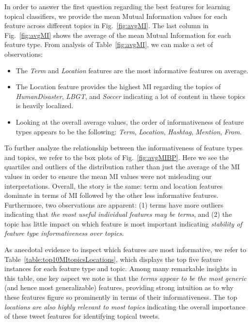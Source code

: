 In order to answer the first question regarding the best features
for learning topical classifiers, we provide the mean Mutual Information
values for each feature across different topics in Fig.~\ref{fig:avgMI}.
The last column in Fig.~\ref{fig:avgMI} shows the
average of the mean Mutual Information for each feature type. From analysis of
Table~\ref{fig:avgMI}, we can make a set of observations:
\begin{itemize}
\item The \textit{Term} and \textit{Location} features are the most informative features on average.%
\item The Location feature provides the highest MI regarding the topics of \textit{HumanDisaster}, \textit{LBGT}, and \textit{Soccer} indicating a lot of content in these topics is heavily localized.
\item Looking at the overall average values, the order of informativeness of feature types appears to be the following: \textit{Term}, \textit{Location}, \textit{Hashtag}, \textit{Mention}, \textit{From}.
\end{itemize}
To further analyze the relationship between the informativeness of feature types and topics,
we refer to the box plots of Fig.~\ref{fig:avgMIBP}.  Here we see the quartiles and outliers of
the distribution rather than just the average of the MI values in order to ensure the mean MI
values were not misleading our interpretations.  Overall, the story is the same: term
and location features dominate in terms of MI followed by the other less informative
features.  Furthermore, two observations are apparent: (1) terms have more outliers indicating that
\emph{the most useful individual features may be terms}, and (2) the topic has little impact on which feature
is most important indicating \emph{stability of feature type informativeness over topics}.

As anecdotal evidence to inspect which features are most informative, we refer to
Table~\ref{table:top10MItopicsLocations}, which displays the top five feature instances
for each feature type and topic.  Among many remarkable insights in this table, one key aspect  
we note is that the \emph{terms appear to be the most generic} (and hence most generalizable) features,
providing strong intuition as to why these features figure so prominently in terms of
their informativeness.  The top \emph{locations are also highly relevant to most topics} indicating
the overall importance of these tweet features for identifying topical tweets.


